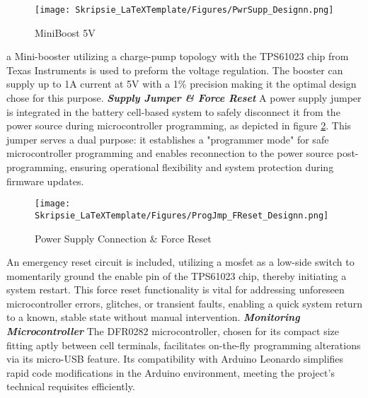 \begin{figure}[h!]
\centering
\texttt{[image: Skripsie\_LaTeXTemplate/Figures/PwrSupp\_Designn.png]}
\caption{MiniBoost 5V \cite{5vSupply}}
\label{fig:MM_D8}
\end{figure}
\noindent
a Mini-booster utilizing a charge-pump topology with the TPS61023 chip from Texas Instruments is used to preform the voltage regulation. The booster can supply up to 1A current at 5V with a 1\% precision making it the optimal design chose for this purpose.\newline\newline
\noindent
\textbf{\emph{Supply Jumper \& Force Reset}}\label{subsubsec:force_RESET}\newline
\noindent
A power supply jumper is integrated in the battery cell-based system to safely disconnect it from the power source during microcontroller programming, as depicted in figure \ref{fig:MM_D7}. This jumper serves a dual purpose: it establishes a "programmer mode" for safe microcontroller programming and enables reconnection to the power source post-programming, ensuring operational flexibility and system protection during firmware updates.

\begin{figure}[h!]
\centering
\texttt{[image: Skripsie\_LaTeXTemplate/Figures/ProgJmp\_FReset\_Designn.png]}
\caption{Power Supply Connection \& Force Reset}
\label{fig:MM_D7}
\end{figure}

\noindent
An emergency reset circuit is included, utilizing a mosfet as a low-side switch to momentarily ground the enable pin of the TPS61023 chip, thereby initiating a system restart. This force reset functionality is vital for addressing unforeseen microcontroller errors, glitches, or transient faults, enabling a quick system return to a known, stable state without manual intervention.\newline\newline
\noindent
\textbf{\emph{Monitoring Microcontroller}}\label{subsubsec:MM_MC}\newline
\noindent
The DFR0282 microcontroller, chosen for its compact size fitting aptly between cell terminals, facilitates on-the-fly programming alterations via its micro-USB feature. Its compatibility with Arduino Leonardo simplifies rapid code modifications in the Arduino environment, meeting the project's technical requisites efficiently.


